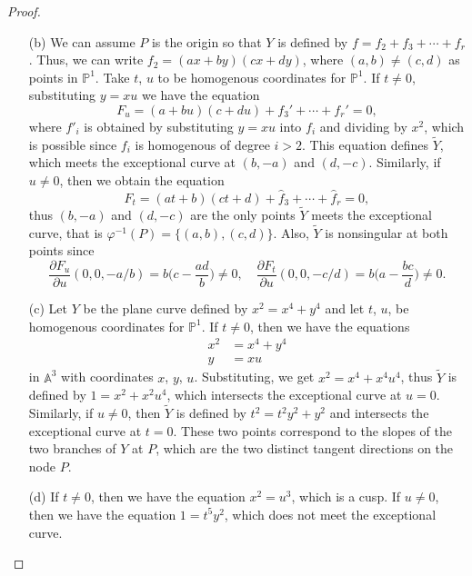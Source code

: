 \documentclass[12pt]{article}
\newcommand{\pd}[2]{\frac{\partial #1}{\partial #2}}
\newcommand{\A}{\mathbb{A}}
\newcommand{\PP}{\mathbb{P}}
\theoremstyle{definition}
\begin{document}
\begin{enumerate} [label=\textbf{\arabic*.}, leftmargin=-0.05em]
\begin{proof}
\begin{itemize}
        \item[(b)] We can assume $P$ is the origin so that $Y$ is defined by $f = f_2 + f_3 + \cdots + f_r$. Thus, we can write $f_2 = (ax + by)(cx + dy)$, where $(a, b) \neq (c, d)$ as points in $\PP^1$. Take $t$, $u$ to be homogenous coordinates for $\PP^1$. If $t \neq 0$, substituting $y = xu$ we have the equation
        \begin{equation*}
            F_u = (a + bu)(c + du) + f_3' + \cdots + f_r' = 0,
        \end{equation*}
        where $f'_i$ is obtained by substituting $y = xu$ into $f_i$ and dividing by $x^2$, which is possible since $f_i$ is homogenous of degree $i > 2$. This equation defines $\tilde{Y}$, which meets the exceptional curve at $(b, -a)$ and $(d, -c)$. Similarly, if $u \neq 0$, then we obtain the equation
        \begin{equation*}
            F_t = (at + b)(ct + d) + \hat{f}_3 + \cdots + \hat{f}_r = 0,
        \end{equation*}
        thus $(b, -a)$ and $(d, -c)$ are the only points $\tilde{Y}$ meets the exceptional curve, that is $\varphi^{-1}(P) = \{ (a, b), (c, d) \}$. Also, $\tilde{Y}$ is nonsingular at both points since
        \begin{equation*}
            \pd{F_u}{u}(0, 0, - a / b) = b\bigg( c - \frac{ad}{b} \bigg) \neq 0, \quad \pd{F_t}{u}(0, 0, - c / d) = b\bigg( a - \frac{bc}{d} \bigg) \neq 0.
        \end{equation*}

        \item[(c)] Let $Y$ be the plane curve defined by $x^2 = x^4 + y^4$ and let $t$, $u$, be homogenous coordinates for $\PP^1$. If $t \neq 0$, then we have the equations
        \begin{align*}
            x^2 & = x^4 + y^4 \\
            y & = xu
        \end{align*}
        in $\A^3$ with coordinates $x$, $y$, $u$. Substituting, we get $x^2 = x^4 + x^4 u^4$, thus $\tilde{Y}$ is defined by $1 = x^2 + x^2u^4$, which intersects the exceptional curve at $u = 0$. Similarly, if $ u \neq 0$, then $\tilde{Y}$ is defined by $t^2 = t^2 y^2 + y^2$ and intersects the exceptional curve at $t = 0$. These two points correspond to the slopes of the two branches of $Y$ at $P$, which are the two distinct tangent directions on the node $P$.

        \item[(d)] If $t \neq 0$, then we have the equation $x^2 = u^3$, which is a cusp. If $u \neq 0$, then we have the equation $1 = t^5 y^2$, which does not meet the exceptional curve.
    \end{itemize}
\end{proof}


\end{enumerate}
\end{document}
